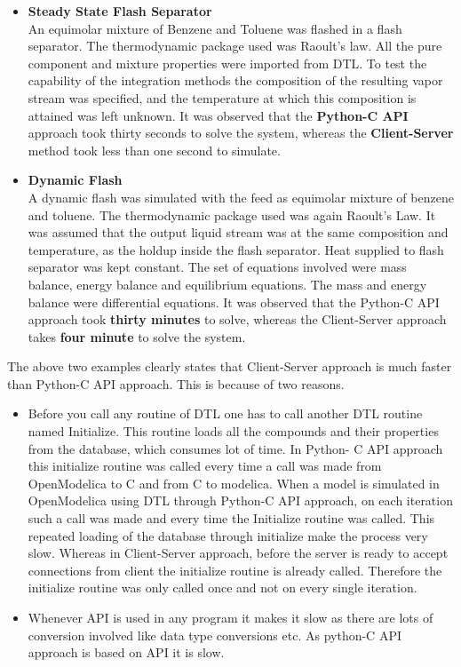 \documentclass[12pt]{report}
\begin{document}
\begin{itemize}
\item{\textbf{Steady State Flash Separator}} \\
An equimolar mixture of Benzene and Toluene was flashed in a flash separator. The thermodynamic package used was Raoult's law. All the pure component and mixture properties were imported from DTL. To test the capability of the integration methods the composition of the resulting vapor stream was specified, and the temperature at which this composition is attained was left unknown. It was observed that the \textbf{Python-C API} approach took thirty seconds to solve the system, whereas the \textbf{Client-Server} method took less than one second to simulate.
\item{\textbf{Dynamic Flash}} \\
A dynamic flash was simulated with the feed as equimolar mixture of benzene and toluene. The thermodynamic package used was again Raoult's Law. It was assumed that the output liquid stream was at the same composition and temperature, as the holdup inside the flash separator. Heat supplied to flash separator was kept constant. The set of equations involved were mass balance, energy balance and equilibrium equations. The mass and energy balance were differential equations. It was observed that the Python-C API approach took \textbf{thirty minutes} to solve, whereas the Client-Server approach takes \textbf{four minute} to solve the system.
\end{itemize}

The above two examples clearly states that Client-Server approach is much faster than Python-C API approach. This is because of two reasons.

\begin{itemize}
\item {Before you call any routine of DTL one has to call another DTL routine named Initialize. This routine loads all the compounds and their properties from the database, which consumes lot of time. In Python- C API approach this initialize routine was called every time a call was made from OpenModelica to C and from C to modelica. When a model is simulated in OpenModelica using DTL through Python-C API approach, on each iteration such a call was made and every time the Initialize routine was called. This repeated loading of the database through initialize make the process very slow. Whereas in Client-Server approach, before the server is ready to accept connections from client the initialize routine is already called. Therefore the initialize routine was only called once and not on every single iteration.}
\item{Whenever API is used in any program it makes it slow as there are lots of conversion involved like data type conversions etc. As python-C API approach is based on API it is slow.}
\end{itemize}
\end{document}
